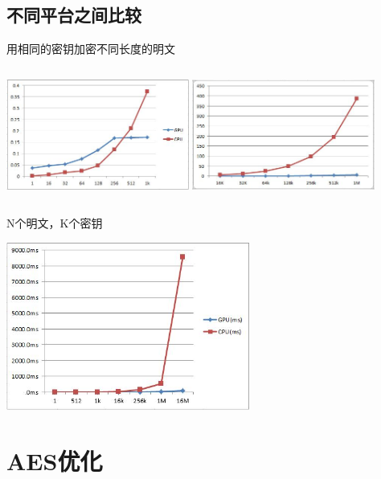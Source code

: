 \documentclass{beamer}
\begin{document}
\subsection{不同平台之间比较}

\begin{frame}{用相同的密钥加密不同长度的明文}
   \begin{columns}[t]
      \centering
      \includegraphics[width=6cm]{graph1.jpg}
      \centering
      \includegraphics[width=6cm]{graph2.jpg}
   \end{columns}
\end{frame}

\begin{frame}{N个明文，K个密钥}
   \begin{center}
      \includegraphics[width=8cm]{graph3.jpg}
   \end{center}
\end{frame}

\section{AES优化}
\end{document}
